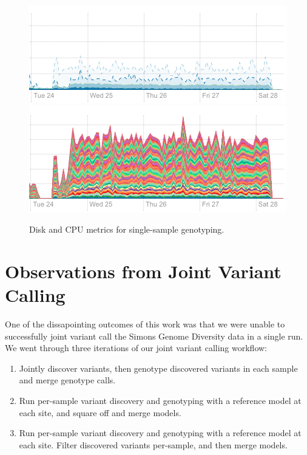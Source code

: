 \documentclass[phd]{ucbthesis}
\begin{document}
\begin{figure}[h]
  \begin{center}
    \includegraphics[width=0.95\linewidth]{graphs/phase2-disk.png}
    \includegraphics[width=0.95\linewidth]{graphs/phase2-cpu.png}
  \end{center}
  \caption{Disk and CPU metrics for single-sample genotyping.}
  \label{fig:phase2}
\end{figure}

\section{Observations from Joint Variant Calling}
\label{sec:joint-calling}

One of the dissapointing outcomes of this work was that we were unable to
successfully joint variant call the Simons Genome Diversity data in a single run.
We went through three iterations of our joint variant calling workflow:

\begin{enumerate}
\item Jointly discover variants, then genotype discovered variants in each
  sample and merge genotype calls.
\item Run per-sample variant discovery and genotyping with a reference model at
  each site, and square off and merge models.
\item Run per-sample variant discovery and genotyping with a reference model at
  each site. Filter discovered variants per-sample, and then merge models.
\end{enumerate}
\end{document}
